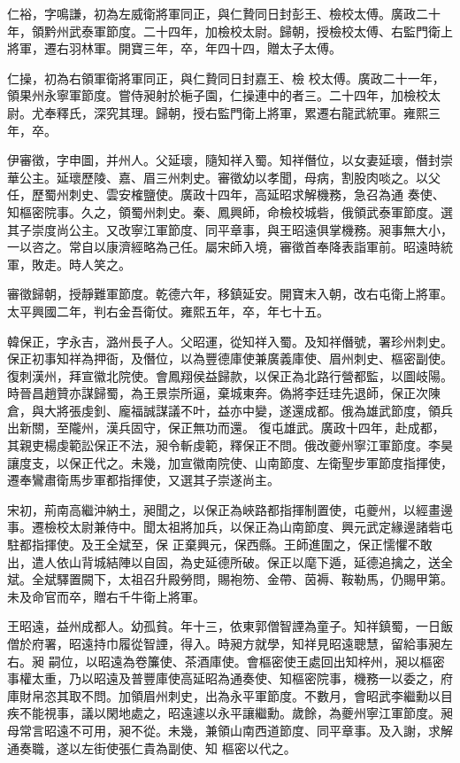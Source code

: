 \begin{pinyinscope}
 仁裕，字鳴謙，初為左威衛將軍同正，與仁贄同日封彭王、檢校太傅。廣政二十年，領黔州武泰軍節度。二十四年，加檢校太尉。歸朝，授檢校太傅、右監門衛上將軍，遷右羽林軍。開寶三年，卒，年四十四，贈太子太傅。



 仁操，初為右領軍衛將軍同正，與仁贄同日封嘉王、檢
 校太傅。廣政二十一年，領果州永寧軍節度。嘗侍昶射於梔子園，仁操連中的者三。二十四年，加檢校太尉。尤奉釋氏，深究其理。歸朝，授右監門衛上將軍，累遷右龍武統軍。雍熙三年，卒。



 伊審徵，字申圖，并州人。父延瓌，隨知祥入蜀。知祥僭位，以女妻延瓌，僭封崇華公主。延瓌歷陵、嘉、眉三州刺史。審徵幼以孝聞，母病，割股肉啖之。以父任，歷蜀州刺史、雲安榷鹽使。廣政十四年，高延昭求解機務，急召為通
 奏使、知樞密院事。久之，領蜀州刺史。秦、鳳興師，命檢校城砦，俄領武泰軍節度。選其子崇度尚公主。又改寧江軍節度、同平章事，與王昭遠俱掌機務。昶事無大小，一以咨之。常自以康濟經略為己任。屬宋師入境，審徵首奉降表詣軍前。昭遠時統軍，敗走。時人笑之。



 審徵歸朝，授靜難軍節度。乾德六年，移鎮延安。開寶末入朝，改右屯衛上將軍。太平興國二年，判右金吾衛仗。雍熙五年，卒，年七十五。



 韓保正，字永吉，潞州長子人。父昭運，從知祥入蜀。及知祥僭號，署珍州刺史。保正初事知祥為押衙，及僭位，以為豐德庫使兼廣義庫使、眉州刺史、樞密副使。復刺漢州，拜宣徽北院使。會鳳翔侯益歸款，以保正為北路行營都監，以圖岐陽。時晉昌趙贊亦謀歸蜀，為王景崇所逼，棄城東奔。偽將李廷珪先退師，保正次陳倉，與大將張虔釗、龐福誠謀議不叶，益亦中變，遂還成都。俄為雄武節度，領兵出新關，至隴州，漢兵固守，保正無功而還。
 復屯雄武。廣政十四年，赴成都，其親吏楊虔範訟保正不法，昶令斬虔範，釋保正不問。俄改夔州寧江軍節度。李昊讓度支，以保正代之。未幾，加宣徽南院使、山南節度、左衛聖步軍節度指揮使，遷奉鸞肅衛馬步軍都指揮使，又選其子崇遂尚主。



 宋初，荊南高繼沖納土，昶聞之，以保正為峽路都指揮制置使，屯夔州，以經畫邊事。遷檢校太尉兼侍中。聞太祖將加兵，以保正為山南節度、興元武定緣邊諸砦屯駐都指揮使。及王全斌至，保
 正棄興元，保西縣。王師進圍之，保正懦懼不敢出，遣人依山背城結陣以自固，為史延德所破。保正以麾下遁，延德追擒之，送全斌。全斌驛置闕下，太祖召升殿勞問，賜袍笏、金帶、茵褥、鞍勒馬，仍賜甲第。未及命官而卒，贈右千牛衛上將軍。



 王昭遠，益州成都人。幼孤貧。年十三，依東郭僧智諲為童子。知祥鎮蜀，一日飯僧於府署，昭遠持巾履從智諲，得入。時昶方就學，知祥見昭遠聰慧，留給事昶左右。昶
 嗣位，以昭遠為卷簾使、茶酒庫使。會樞密使王處回出知梓州，昶以樞密事權太重，乃以昭遠及普豐庫使高延昭為通奏使、知樞密院事，機務一以委之，府庫財帛恣其取不問。加領眉州刺史，出為永平軍節度。不數月，會昭武李繼勳以目疾不能視事，議以閑地處之，昭遠遽以永平讓繼勳。歲餘，為夔州寧江軍節度。昶母常言昭遠不可用，昶不從。未幾，兼領山南西道節度、同平章事。及入謝，求解通奏職，遂以左街使張仁貴為副使、知
 樞密以代之。




\end{pinyinscope}
